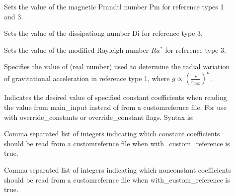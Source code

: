 \documentclass[letterpaper,11pt,english]{sphinxmanual}
\begin{document}
\begin{description}
\item[{}] \leavevmode
\sphinxAtStartPar
Sets the value of the magnetic Prandtl number Pm for reference types 1 and 3.

\item[{}] \leavevmode
\sphinxAtStartPar
Sets the value of the dissipationg number Di for reference type 3.

\item[{}] \leavevmode
\sphinxAtStartPar
Sets the value of the modified Rayleigh number \(Ra^*\)  for reference type 3.

\item[{}] \leavevmode
\sphinxAtStartPar
Specifies the value of  (real number) used to determine the radial variation of gravitational acceleration  in reference type 1, where \(g\propto\left(\frac{r}{r_\mathrm{max}}\right)^n\).

\item[{}] \leavevmode
\sphinxAtStartPar
Indicates the desired value of specified constant coefficients when reading the value from main\_input instead of from a custom\sphinxhyphen{}refernce file.  For use with override\_constants or override\_constant flags.   Syntax is:

\begin{sphinxVerbatim}[commandchars=\\\{\}]
    
   
\end{sphinxVerbatim}

\item[{}] \leavevmode
\sphinxAtStartPar
Comma separated list of integers indicating which constant coefficients should be read from a custom\sphinxhyphen{}refernce file when with\_custom\_reference is true.

\item[{}] \leavevmode
\sphinxAtStartPar
Comma separated list of integers indicating which non\sphinxhyphen{}constant coefficients should be read from a custom\sphinxhyphen{}refernce file when with\_custom\_reference is true.


\end{description}
\end{document}
